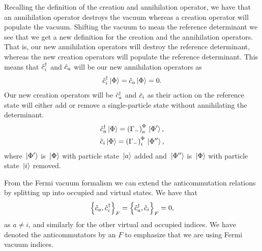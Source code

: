             Recalling the definition of the creation and annihilation operator,
            we have that an annihilation operator destroys the vacuum whereas a
            creation operator will populate the vacuum.
            Shifting the vacuum to mean the reference determinant we see that we
            get a new definition for the creation and the annihilation
            operators.
            That is, our new annihilation operators will destroy the reference
            determinant, whereas the new creation operators will populate the
            reference determinant.
            This means that $\hat{c}_{i}^{\dagger}$ and $\hat{c}_{a}$ will be our new annihilation
            operators as
            \begin{align}
                \hat{c}_{i}^{\dagger}\ket*{\Phi} = \hat{c}_{a}\ket*{\Phi} = 0.
            \end{align}
            Our new creation operators will be $\hat{c}_{a}^{\dagger}$ and $\hat{c}_{i}$ as their
            action on the reference state will either add or remove a
            single-particle state without annihilating the determinant.
            \begin{gather}
                \hat{c}_{a}^{\dagger}\ket*{\Phi}
                = \left( \Gamma_{-} \right)^{\Phi}_{a}\ket*{\Phi'},
                \\
                \hat{c}_{i}\ket*{\Phi}
                = \left( \Gamma_{-} \right)^{\Phi}_{i}\ket*{\Phi''},
            \end{gather}
            where $\ket*{\Phi'}$ is $\ket*{\Phi}$ with particle state $\ket*{a}$
            added and $\ket*{\Phi''}$ is $\ket*{\Phi}$ with particle state
            $\ket*{i}$ removed.

            From the Fermi vacuum formalism we can extend the anticommutation
            relations by splitting up into occupied and virtual states.
            We have that
            \begin{align}
                \left\{\hat{c}_{a}, \hat{c}_{i}^{\dagger}\right\}_F
                = \left\{\hat{c}_{a}^{\dagger}, \hat{c}_{i}\right\}_F
                = 0,
                \label{eq:fermi-anticommutation-zero}
            \end{align}
            as $a \neq i$, and similarly for the other virtual and occupied
            indices.
            We have denoted the anticommutators by an $F$ to emphasize that we
            are using Fermi vacuum indices.

